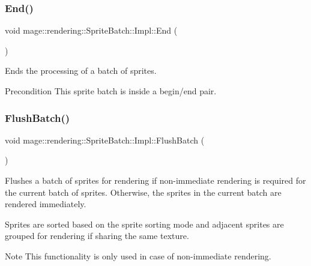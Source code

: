 \subsubsection{\texorpdfstring{End()}{End()}}
{\footnotesize\ttfamily void mage\+::rendering\+::\+Sprite\+Batch\+::\+Impl\+::\+End (\begin{DoxyParamCaption}{ }\end{DoxyParamCaption})}

Ends the processing of a batch of sprites.

\begin{DoxyPrecond}{Precondition}
This sprite batch is inside a begin/end pair. 
\end{DoxyPrecond}
\hypertarget{classmage_1_1rendering_1_1_sprite_batch_1_1_impl_a65afd35385400d629abc9f60adfadeff}{}\label{classmage_1_1rendering_1_1_sprite_batch_1_1_impl_a65afd35385400d629abc9f60adfadeff} 
\subsubsection{\texorpdfstring{Flush\+Batch()}{FlushBatch()}}
{\footnotesize\ttfamily void mage\+::rendering\+::\+Sprite\+Batch\+::\+Impl\+::\+Flush\+Batch (\begin{DoxyParamCaption}{ }\end{DoxyParamCaption})\hspace{0.3cm}{\ttfamily [private]}}

Flushes a batch of sprites for rendering if non-\/immediate rendering is required for the current batch of sprites. Otherwise, the sprites in the current batch are rendered immediately.

Sprites are sorted based on the sprite sorting mode and adjacent sprites are grouped for rendering if sharing the same texture.

\begin{DoxyNote}{Note}
This functionality is only used in case of non-\/immediate rendering. 
\end{DoxyNote}
\hypertarget{classmage_1_1rendering_1_1_sprite_batch_1_1_impl_abcbbd766f6b1355e5d015cbdcaacfc07}{}\label{classmage_1_1rendering_1_1_sprite_batch_1_1_impl_abcbbd766f6b1355e5d015cbdcaacfc07} 
